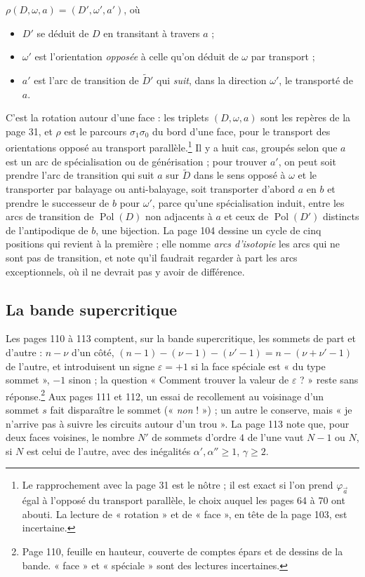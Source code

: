 \documentclass[11pt,a4paper]{article}
\begin{document}
$\rho(D, \omega, a) = (D', \omega', a')$, où
\begin{itemize}
\item[a)] $D'$ se déduit de $D$ en transitant à travers $a$ ;
\item[b)] $\omega'$ est l'orientation \emph{opposée} à celle qu'on déduit de
$\omega$ par transport ;
\item[c)] $a'$ est l'arc de transition de $\widetilde{D}'$ qui \emph{suit}, dans
la direction $\omega'$, le transporté de $a$.
\end{itemize}
C'est la rotation autour d'une face : les triplets $(D, \omega, a)$ sont les
repères de la page 31, et $\rho$ est le parcours $\sigma_1\sigma_0$ du bord
d'une face, pour le transport des orientations opposé au transport
parallèle.\footnote{Le rapprochement avec la page 31 est le nôtre ; il est
exact si l'on prend $\varphi_{\vec{a}}$ égal à l'opposé du transport parallèle,
le choix auquel les pages 64 à 70 ont abouti. La lecture de « rotation » et de
« face », en tête de la page 103, est incertaine.} Il y a huit cas, groupés
selon que $a$ est un arc de spécialisation ou de générisation ; pour trouver
$a'$, on peut soit prendre l'arc de transition qui suit $a$ sur $\widetilde{D}$
dans le sens opposé à $\omega$ et le transporter par balayage ou
anti-balayage, soit transporter d'abord $a$ en $b$ et prendre le successeur de
$b$ pour $\omega'$, parce qu'une spécialisation induit, entre les arcs de
transition de $\operatorname{Pol}(D)$ non adjacents à $a$ et ceux de
$\operatorname{Pol}(D')$ distincts de l'antipodique de $b$, une bijection. La
page 104 dessine un cycle de cinq positions qui revient à la première ; elle
nomme \emph{arcs d'isotopie} les arcs qui ne sont pas de transition, et note
qu'il faudrait regarder à part les arcs exceptionnels, où il ne devrait pas y
avoir de différence.

\subsection*{La bande supercritique}

Les pages 110 à 113 comptent, sur la bande supercritique, les sommets de part et
d'autre : $n - \nu$ d'un côté, $(n - 1) - (\nu - 1) - (\nu' - 1) = n - (\nu +
\nu' - 1)$ de l'autre, et introduisent un signe $\varepsilon = +1$ si la face
spéciale est « du type sommet », $-1$ sinon ; la question « Comment trouver la
valeur de $\varepsilon$ ? » reste sans réponse.\footnote{Page 110, feuille en hauteur, couverte
de comptes épars et de dessins de la bande. « face » et « spéciale » sont des
lectures incertaines.} Aux pages 111 et 112, un essai de recollement au voisinage
d'un sommet $s$ fait disparaître le sommet (« \emph{non} ! ») ; un autre le
conserve, mais « je n'arrive pas à suivre les circuits autour d'un trou ». La
page 113 note que, pour deux faces voisines, le nombre $N'$ de sommets d'ordre
$4$ de l'une vaut $N - 1$ ou $N$, si $N$ est celui de l'autre, avec des
inégalités $\alpha', \alpha'' \geqslant 1$, $\gamma \geqslant 2$.
\end{document}
